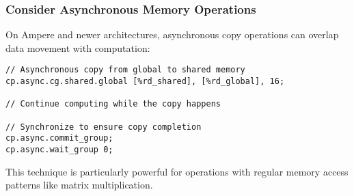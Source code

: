 \subsubsection{Consider Asynchronous Memory Operations}

On Ampere and newer architectures, asynchronous copy operations can overlap data movement with computation:

\begin{lstlisting}[style=ptx]
// Asynchronous copy from global to shared memory
cp.async.cg.shared.global [%rd_shared], [%rd_global], 16;

// Continue computing while the copy happens

// Synchronize to ensure copy completion
cp.async.commit_group;
cp.async.wait_group 0;
\end{lstlisting}

This technique is particularly powerful for operations with regular memory access patterns like matrix multiplication.

